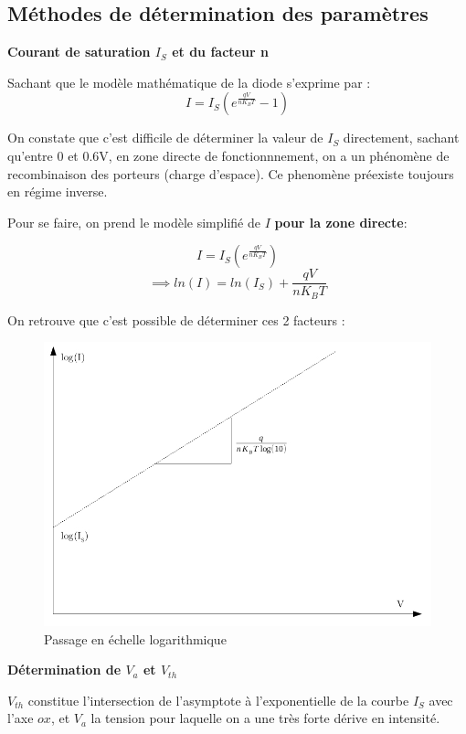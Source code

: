 \documentclass[11pt]{article}
\begin{document}
\subsection{M\'ethodes de d\'etermination des param\`etres}

\textbf{Courant de saturation $I_S$ et du facteur n}

Sachant que le mod\`ele math\'ematique de la diode s'exprime par :
\[
	I = I_S (e^{\frac{q V}{n K_B T}} - 1 )
\]

On constate que c'est difficile de d\'eterminer la valeur de $I_{S}$ directement, sachant qu'entre 0 et 0.6V, en zone directe de fonctionnnement, on a un ph\'enom\`ene de recombinaison des porteurs (charge d'espace). Ce phenom\`ene pr\'eexiste toujours en r\'egime inverse.

Pour se faire, on prend le mod\`ele simplifi\'e de $I$ \textbf{pour la zone directe}:

\[
	I = I_S (e^{\frac{q V}{n K_B T}})
\]
\[
\implies	ln(I) = ln(I_S) +  \frac{q V}{n K_B T}
\]

On retrouve que c'est possible de d\'eterminer ces 2 facteurs :

\begin{figure}[!htb]
\centering
\includegraphics[scale=0.54]{log_echelle.jpg}
\caption{Passage en \'echelle logarithmique}
\end{figure}


\textbf{D\'etermination de $V_a$ et $V_{th}$} 

$V_{th}$ constitue l'intersection de l'asymptote \`a l'exponentielle de la courbe $I_{S}$ avec l'axe $ox$, et $V_{a}$ la tension pour laquelle on a une tr\`es forte d\'erive en intensit\'e.
\end{document}
